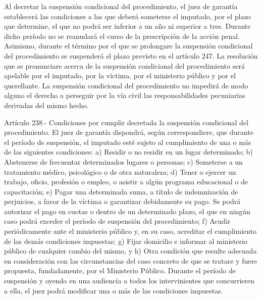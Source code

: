     Al decretar la suspensión condicional del procedimiento, el juez de garantía establecerá las condiciones a las que deberá someterse el imputado, por el plazo que determine, el que no podrá ser inferior a un año ni superior a tres. Durante dicho período no se reanudará el curso de la prescripción de la acción penal. Asimismo, durante el término por el que se prolongare la suspensión condicional del procedimiento se suspenderá el plazo previsto en el artículo 247.
    La resolución que se pronunciare acerca de la suspensión condicional del procedimiento será apelable por el imputado, por la víctima, por el ministerio público y por el querellante.
    La suspensión condicional del procedimiento no impedirá de modo alguno el derecho a perseguir por la vía civil las responsabilidades pecuniarias derivadas del mismo hecho.





    Artículo 238.- Condiciones por cumplir decretada la suspensión condicional del procedimiento. El juez de garantía dispondrá, según correspondiere, que durante el período de suspensión, el imputado esté sujeto al cumplimiento de una o más de las siguientes condiciones:
    a) Residir o no residir en un lugar determinado;
    b) Abstenerse de frecuentar determinados lugares o
personas;
    c) Someterse a un tratamiento médico, psicológico o
de otra naturaleza;
    d) Tener o ejercer un trabajo, oficio, profesión o
empleo, o asistir a algún programa educacional o de
capacitación;
    e) Pagar una determinada suma, a título de
indemnización de perjuicios, a favor de la víctima o
garantizar debidamente su pago. Se podrá autorizar el
pago en cuotas o dentro de un determinado plazo, el que
en ningún caso podrá exceder el período de suspensión
del procedimiento;
    f) Acudir periódicamente ante el ministerio público
y, en su caso, acreditar el cumplimiento de las demás
condiciones impuestas;
    g) Fijar domicilio e informar al ministerio público
de cualquier cambio del mismo, y
    h) Otra condición que resulte adecuada en
consideración con las circunstancias del caso concreto
de que se tratare y fuere propuesta, fundadamente, por
el Ministerio Público.
    Durante el período de suspensión y oyendo en una
audiencia a todos los intervinientes que concurrieren a
ella, el juez podrá modificar una o más de las
condiciones impuestas.

